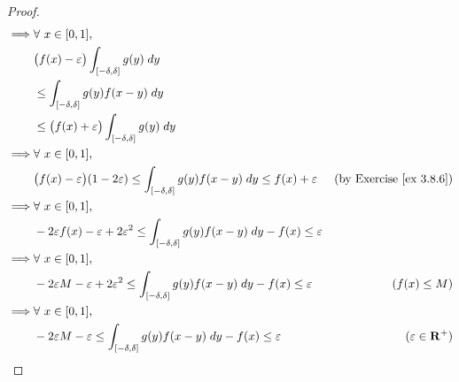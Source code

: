 \begin{proof}
\begin{align*}
        \implies & \forall\ x \in [0, 1],                                                                                                                                              \\
                 & \big(f(x) - \varepsilon\big) \int_{[-\delta, \delta]} g(y) \; dy                                                                                                    \\
                 & \leq \int_{[-\delta, \delta]} g(y) f(x - y) \; dy                                                                                                                   \\
                 & \leq \big(f(x) + \varepsilon\big) \int_{[-\delta, \delta]} g(y) \; dy                                                                                               \\
        \implies & \forall\ x \in [0, 1],                                                                                                                                              \\
                 & \big(f(x) - \varepsilon\big) (1 - 2 \varepsilon) \leq \int_{[-\delta, \delta]} g(y) f(x - y) \; dy \leq f(x) + \varepsilon    & \text{(by Exercise \ref{ex 3.8.6})} \\
        \implies & \forall\ x \in [0, 1],                                                                                                                                              \\
                 & -2 \varepsilon f(x) - \varepsilon + 2 \varepsilon^2 \leq \int_{[-\delta, \delta]} g(y) f(x - y) \; dy - f(x) \leq \varepsilon                                       \\
        \implies & \forall\ x \in [0, 1],                                                                                                                                              \\
                 & -2 \varepsilon M - \varepsilon + 2 \varepsilon^2 \leq \int_{[-\delta, \delta]} g(y) f(x - y) \; dy - f(x) \leq \varepsilon    & (f(x) \leq M)                       \\
        \implies & \forall\ x \in [0, 1],                                                                                                                                              \\
                 & -2 \varepsilon M - \varepsilon \leq \int_{[-\delta, \delta]} g(y) f(x - y) \; dy - f(x) \leq \varepsilon                      & (\varepsilon \in \mathbf{R}^+)      \\

\end{align*}
\end{proof}
